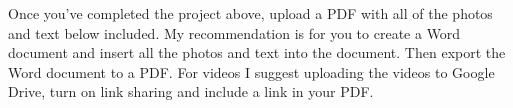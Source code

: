 Once you've completed the project above, upload a PDF with all of the photos and text
below included. My recommendation is for you to create a Word document
and insert all the photos and text into the document. Then export the
Word document to a PDF. For videos I suggest uploading the videos to
Google Drive, turn on link sharing and include a link in your PDF.
